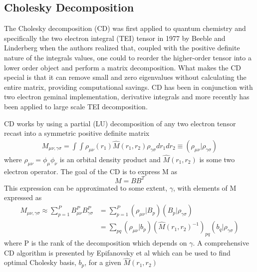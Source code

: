 	\subsection{Cholesky Decomposition}
		The Cholesky decomposition (CD) was first applied to quantum chemistry and specifically the two electron integral (TEI) tensor in 1977 by Beeble and Linderberg\cite{Beebe1977} when the authors realized that, coupled with the positive definite nature of the integrals values, one could to reorder the higher-order tensor into a lower order object and perform a matrix decomposition. What makes the CD special is that it can remove small and zero eigenvalues without calculating the entire matrix, providing computational savings. CD has been in conjunction with two electron geminal implementation, derivative integrals and more recently has been applied to large scale TEI decomposition\cite{Aquilante2011}.

		CD works by using a partial (LU) decomposition of any two electron tensor recast into a symmetric positive definite matrix 
			\begin{equation}
				\begin{aligned}
					\label{eqn:CD}
					M_{\mu\nu, \gamma\sigma} = \int \int \rho_{\mu\nu}(r_1)\hat{M}(r_1,r_2) \rho_{\gamma\sigma} dr_1 dr_2 \equiv (\rho_{\mu\nu}|\rho_{\gamma\sigma})
				\end{aligned}
			\end{equation}
		where $\rho_{\mu\nu} = \phi_\mu\phi_\nu$ is an orbital density product and $\hat{M}(r_1,r_2)$ is some two electron operator. The goal of the CD is to express M as 
			\begin{equation}
				M = BB^T
			\end{equation}
		This expression can be approximated to some extent, $\gamma$, with elements of M expressed as%
			\begin{equation}
				\begin{aligned}
					M_{\mu\nu, \gamma\sigma} \approx \sum_{p=1}^{P} B_{\mu\nu}^P B_{\gamma\sigma}^P &= \sum_{p=1}^{P} (\rho_{\mu\nu}|B_p)(B_p|\rho_{\gamma\sigma})\\
					&= \sum_{pq} (\rho_{\mu\nu}|b_p)(\hat{M}(r_1,r_2)^{-1})_{pq}(b_q|\rho_{\gamma\sigma})
				\end{aligned}
			\end{equation}
		where P is the rank of the decomposition which depends on $\gamma$. A comprehensive CD algorithm is presented by Epifanovsky et al\cite{Epifanovsky2013} which can be used to find optimal Cholesky basis, $b_p$, for a given $\hat{M}(r_1,r_2)$
